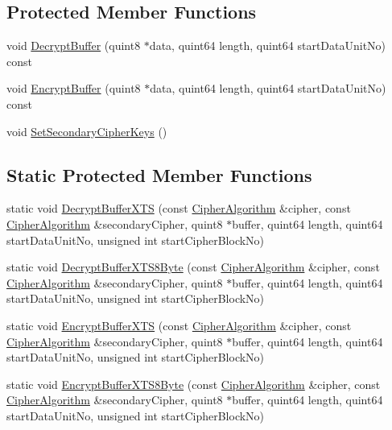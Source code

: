 \subsection*{Protected Member Functions}
\begin{DoxyCompactItemize}
\item 
void \hyperlink{class_gost_crypt_1_1_volume_1_1_encryption_mode_x_t_s_a225c9aba86cc7830171b83781cbcc74d}{Decrypt\+Buffer} (quint8 $\ast$data, quint64 length, quint64 start\+Data\+Unit\+No) const
\item 
void \hyperlink{class_gost_crypt_1_1_volume_1_1_encryption_mode_x_t_s_ae4985126420eaf1dd1c0776b1310b067}{Encrypt\+Buffer} (quint8 $\ast$data, quint64 length, quint64 start\+Data\+Unit\+No) const
\item 
void \hyperlink{class_gost_crypt_1_1_volume_1_1_encryption_mode_x_t_s_a13fb5f95f6a628dc888c81a66d12da25}{Set\+Secondary\+Cipher\+Keys} ()
\end{DoxyCompactItemize}
\subsection*{Static Protected Member Functions}
\begin{DoxyCompactItemize}
\item 
static void \hyperlink{class_gost_crypt_1_1_volume_1_1_encryption_mode_x_t_s_ac10db863103edaf603386db3f1a93e86}{Decrypt\+Buffer\+X\+TS} (const \hyperlink{class_gost_crypt_1_1_volume_1_1_cipher_algorithm}{Cipher\+Algorithm} \&cipher, const \hyperlink{class_gost_crypt_1_1_volume_1_1_cipher_algorithm}{Cipher\+Algorithm} \&secondary\+Cipher, quint8 $\ast$buffer, quint64 length, quint64 start\+Data\+Unit\+No, unsigned int start\+Cipher\+Block\+No)
\item 
static void \hyperlink{class_gost_crypt_1_1_volume_1_1_encryption_mode_x_t_s_a3577c8735d4ef23c1155315a2555d97b}{Decrypt\+Buffer\+X\+T\+S8\+Byte} (const \hyperlink{class_gost_crypt_1_1_volume_1_1_cipher_algorithm}{Cipher\+Algorithm} \&cipher, const \hyperlink{class_gost_crypt_1_1_volume_1_1_cipher_algorithm}{Cipher\+Algorithm} \&secondary\+Cipher, quint8 $\ast$buffer, quint64 length, quint64 start\+Data\+Unit\+No, unsigned int start\+Cipher\+Block\+No)
\item 
static void \hyperlink{class_gost_crypt_1_1_volume_1_1_encryption_mode_x_t_s_a0fba1395ce48875b9243beebf0b44a5b}{Encrypt\+Buffer\+X\+TS} (const \hyperlink{class_gost_crypt_1_1_volume_1_1_cipher_algorithm}{Cipher\+Algorithm} \&cipher, const \hyperlink{class_gost_crypt_1_1_volume_1_1_cipher_algorithm}{Cipher\+Algorithm} \&secondary\+Cipher, quint8 $\ast$buffer, quint64 length, quint64 start\+Data\+Unit\+No, unsigned int start\+Cipher\+Block\+No)
\item 
static void \hyperlink{class_gost_crypt_1_1_volume_1_1_encryption_mode_x_t_s_aa712631e9a2bb83e9322693a49b12183}{Encrypt\+Buffer\+X\+T\+S8\+Byte} (const \hyperlink{class_gost_crypt_1_1_volume_1_1_cipher_algorithm}{Cipher\+Algorithm} \&cipher, const \hyperlink{class_gost_crypt_1_1_volume_1_1_cipher_algorithm}{Cipher\+Algorithm} \&secondary\+Cipher, quint8 $\ast$buffer, quint64 length, quint64 start\+Data\+Unit\+No, unsigned int start\+Cipher\+Block\+No)
\end{DoxyCompactItemize}
